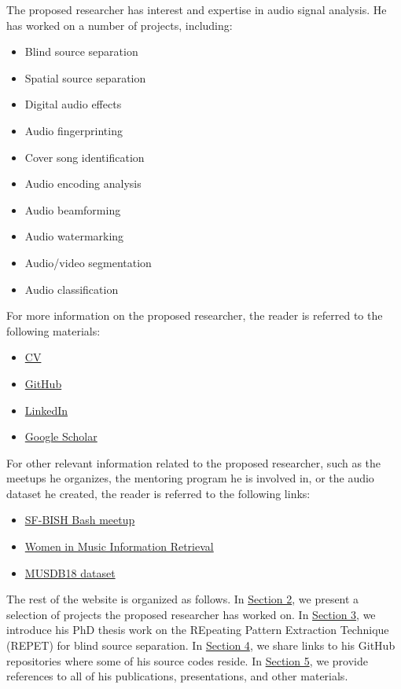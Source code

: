 \documentclass{article}
\begin{document}
The proposed researcher has interest and expertise in audio signal analysis. He has worked on a number of projects, including:
\begin{itemize}[noitemsep,topsep=0pt]
\item Blind source separation
\item Spatial source separation
\item Digital audio effects
\item Audio fingerprinting
\item Cover song identification
\item Audio encoding analysis
\item Audio beamforming
\item Audio watermarking
\item Audio/video segmentation
\item Audio classification
\end{itemize}

For more information on the proposed researcher, the reader is referred to the following materials:
\begin{itemize}[noitemsep,topsep=0pt]
\item \href{http://zafarrafii.com/Zafar Rafii - CV.pdf}{CV}
\item \href{https://github.com/zafarrafii}{GitHub}
\item \href{https://www.linkedin.com/in/zafarrafii/}{LinkedIn}
\item \href{https://scholar.google.com/citations?user=8wbS2EsAAAAJ&hl=en}{Google Scholar}
\end{itemize}

For other relevant information related to the proposed researcher, such as the meetups he organizes, the mentoring program he is involved in, or the audio dataset he created, the reader is referred to the following links:
\begin{itemize}[noitemsep,topsep=0pt]
\item \href{https://www.meetup.com/bishbash/}{SF-BISH Bash meetup}
\item \href{https://wimir.wordpress.com/}{Women in Music Information Retrieval}
\item \href{https://sigsep.github.io/datasets/musdb.html#musdb18-compressed-stems}{MUSDB18 dataset}
\end{itemize}

The rest of the website is organized as follows. In \hyperref[sec:research]{Section 2}, we present a selection of projects the proposed researcher has worked on. In \hyperref[sec:repet]{Section 3}, we introduce his PhD thesis work on the REpeating Pattern Extraction Technique (REPET) for blind source separation. In \hyperref[sec:codes]{Section 4}, we share links to his GitHub repositories where some of his source codes reside. In \hyperref[sec:refs]{Section 5}, we provide references to all of his publications, presentations, and other materials.
\end{document}
